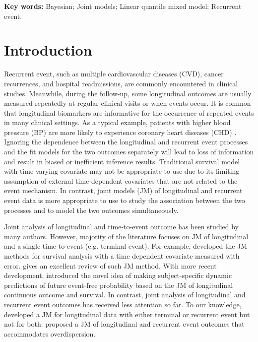 {\bf Key words:} Bayesian; Joint models; Linear quantile mixed model; Recurrent event.


\section{Introduction}
Recurrent event, such as multiple cardiovascular diseases (CVD), cancer recurrences, and hospital readmissions, are commonly encountered in clinical studies. Meanwhile, during the follow-up, some longitudinal outcomes are usually measured repeatedly at regular clinical visits or when events occur. It is common that longitudinal biomarkers are informative for the occurrence of repeated events in many clinical settings. As a typical example, patients with higher blood pressure (BP) are more likely to experience coronary heart diseases (CHD) \citep{wattanakit2005risk, rodriguez2014systolic}. Ignoring the dependence between the longitudinal and recurrent event processes and the fit models for the two outcomes separately will lead to loss of information and result in biased or inefficient inference results. Traditional survival model with time-varying covariate may not be appropriate to use due to its limiting assumption of external time-dependent covariates that are not related to the event mechanism. In contrast, joint models (JM) of longitudinal and recurrent event data is more appropriate to use to study the association between the two processes and to model the two outcomes simultaneously.

Joint analysis of longitudinal and time-to-event outcome has been studied by many authors. However, majority of the literature focuses on JM of longitudinal and a single time-to-event (e.g. terminal event). For example, \cite{self1992modeling, tsiatis1995modeling, wulfsohn1997joint} developed the JM methods for survival analysis with a time dependent covariate measured with error. \cite{tsiatis2004joint} gives an excellent review of such JM method. With more recent development, \cite{rizopoulos2011dynamic,taylor2013real} introduced the novel idea of making subject-specific dynamic predictions of future event-free probability based on the JM of longitudinal continuous outcome and survival. In contrast, joint analysis of longitudinal and recurrent event outcomes has received less attention so far. To our knowledge, \cite{henderson2000joint} developed a JM for longitudinal data with either terminal or recurrent event but not for both. \cite{efendi2013joint} proposed a JM of longitudinal and recurrent event outcomes that accommodates overdispersion.

